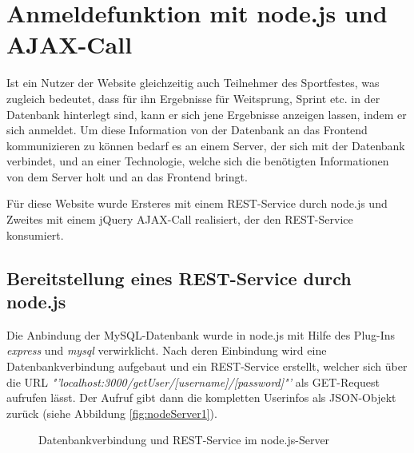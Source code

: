 \section{Anmeldefunktion mit node.js und AJAX-Call}
\label{Anmeldefunktion mit node.js und AJAX-Call}
Ist ein Nutzer der Website gleichzeitig auch Teilnehmer des Sportfestes, was zugleich bedeutet, dass für ihn Ergebnisse für Weitsprung, Sprint etc. in der Datenbank hinterlegt sind, kann er sich jene Ergebnisse anzeigen lassen, indem er sich anmeldet. Um diese Information von der Datenbank an das Frontend kommunizieren zu können bedarf es an einem Server, der sich mit der Datenbank verbindet, und an einer Technologie, welche sich die benötigten Informationen von dem Server holt und an das Frontend bringt. 
\par
Für diese Website wurde Ersteres mit einem REST-Service durch node.js und Zweites mit einem jQuery AJAX-Call realisiert, der den REST-Service konsumiert.

\subsection{Bereitstellung eines REST-Service durch node.js}
\label{Bereitstellung eines REST-Service durch node.js}
Die Anbindung der MySQL-Datenbank wurde in node.js mit Hilfe des Plug-Ins \textit{express} und \textit{mysql} verwirklicht. Nach deren Einbindung wird eine Datenbankverbindung aufgebaut und ein REST-Service erstellt, welcher sich über die URL \textit{"'localhost:3000/getUser/[username]/[password]"'} als GET-Request aufrufen lässt. Der Aufruf gibt dann die kompletten Userinfos als JSON-Objekt zurück (siehe Abbildung \vref{fig:nodeServer1}).

\begin{figure}[!h]
	\caption{Datenbankverbindung und REST-Service im node.js-Server}
	\label{fig:nodeServer1}
\end{figure}

